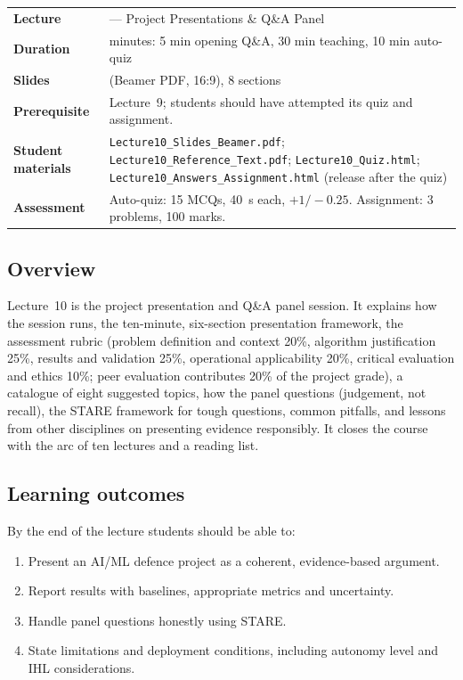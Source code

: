 \documentclass[11pt]{article}
\begin{document}
\begin{center}\small\renewcommand{\arraystretch}{1.25}\begin{tabularx}{\textwidth}{@{}>{\bfseries}p{3.3cm}>{\raggedright\arraybackslash}X@{}}\toprule

\textcolor{NavyN}{Lecture}&10 --- Project Presentations \& Q\&A Panel\\
\textcolor{NavyN}{Duration}&45 minutes: 5 min opening Q\&A, 30 min teaching, 10 min auto-quiz\\
\textcolor{NavyN}{Slides}&11 (Beamer PDF, 16:9), 8 sections\\
\textcolor{NavyN}{Prerequisite}&Lecture~9; students should have attempted its quiz and assignment.\\
\textcolor{NavyN}{Student materials}&\texttt{Lecture10\_Slides\_Beamer.pdf}; \texttt{Lecture10\_Reference\_Text.pdf}; \texttt{Lecture10\_Quiz.html}; \texttt{Lecture10\_Answers\_Assignment.html} (release after the quiz)\\
\textcolor{NavyN}{Assessment}&Auto-quiz: 15 MCQs, 40~s each, $+1/-0.25$. Assignment: 3 problems, 100 marks.\\\bottomrule\end{tabularx}\end{center}

\subsection*{Overview}Lecture~10 is the project presentation and Q\&A panel session. It explains how the session runs, the ten-minute, six-section presentation framework, the assessment rubric (problem definition and context 20\%, algorithm justification 25\%, results and validation 25\%, operational applicability 20\%, critical evaluation and ethics 10\%; peer evaluation contributes 20\% of the project grade), a catalogue of eight suggested topics, how the panel questions (judgement, not recall), the STARE framework for tough questions, common pitfalls, and lessons from other disciplines on presenting evidence responsibly. It closes the course with the arc of ten lectures and a reading list.

\subsection*{Learning outcomes}By the end of the lecture students should be able to:\begin{enumerate}\item Present an AI/ML defence project as a coherent, evidence-based argument.\item Report results with baselines, appropriate metrics and uncertainty.\item Handle panel questions honestly using STARE.\item State limitations and deployment conditions, including autonomy level and IHL considerations.\end{enumerate}
\end{document}
